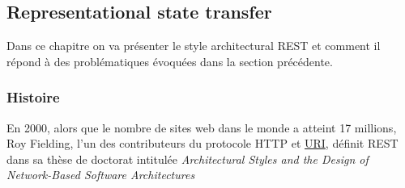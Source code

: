\subsection{Representational state transfer}
Dans ce chapitre on va présenter le style architectural REST et comment il répond à des problématiques évoquées dans la section précédente. 
\subsubsection{Histoire}
En 2000, alors que le nombre de sites web dans le monde a atteint 17 millions, Roy Fielding, l'un des contributeurs du protocole HTTP et \href{https://tools.ietf.org/html/rfc3986}{URI}, définit REST dans sa thèse de doctorat intitulée \emph{Architectural Styles and the Design of Network-Based Software Architectures} \cite{roythesis}






